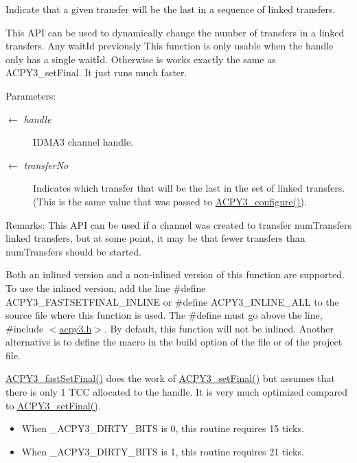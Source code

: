 Indicate that a given transfer will be the last in a sequence of linked transfers. 

This API can be used to dynamically change the number of transfers in a linked transfers. Any wait\-Id previously This function is only usable when the handle only has a single wait\-Id. Otherwise is works exactly the same as ACPY3\_\-set\-Final. It just runs much faster.

\begin{Desc}
\item[Parameters:]
\begin{description}
\item[\mbox{$\leftarrow$} {\em handle}]IDMA3 channel handle. \item[\mbox{$\leftarrow$} {\em transfer\-No}]Indicates which transfer that will be the last in the set of linked transfers. (This is the same value that was passed to \hyperlink{group___d_s_p_a_c_p_y3_g427e8e4fd5c445b2f9bb5d971c06c099}{ACPY3\_\-configure()}).\end{description}
\end{Desc}
\begin{Desc}
\item[Remarks:]This API can be used if a channel was created to transfer num\-Transfers linked transfers, but at some point, it may be that fewer transfers than num\-Transfers should be started.

Both an inlined version and a non-inlined version of this function are supported. To use the inlined version, add the line \#define ACPY3\_\-FASTSETFINAL\_\-INLINE or \#define ACPY3\_\-INLINE\_\-ALL to the source file where this function is used. The \#define must go above the line, \#include $<$\hyperlink{acpy3_8h}{acpy3.h}$>$. By default, this function will not be inlined. Another alternative is to define the macro in the build option of the file or of the project file.

\hyperlink{group___d_s_p_a_c_p_y3_g44f2ce173d41bc7bbfb6e7fb500ec58f}{ACPY3\_\-fast\-Set\-Final()} does the work of \hyperlink{group___d_s_p_a_c_p_y3_gfc7ddb15d68ef3741abfb8843763fce5}{ACPY3\_\-set\-Final()} but assumes that there is only 1 TCC allocated to the handle. It is very much optimized compared to \hyperlink{group___d_s_p_a_c_p_y3_gfc7ddb15d68ef3741abfb8843763fce5}{ACPY3\_\-set\-Final()}.

\begin{itemize}
\item When \_\-ACPY3\_\-DIRTY\_\-BITS is 0, this routine requires 15 ticks.\item When \_\-ACPY3\_\-DIRTY\_\-BITS is 1, this routine requires 21 ticks.\end{itemize}
\end{Desc}
